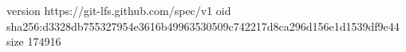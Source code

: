 version https://git-lfs.github.com/spec/v1
oid sha256:d3328db755327954e3616b49963530509c742217d8ca296d156e1d1539df9e44
size 174916
